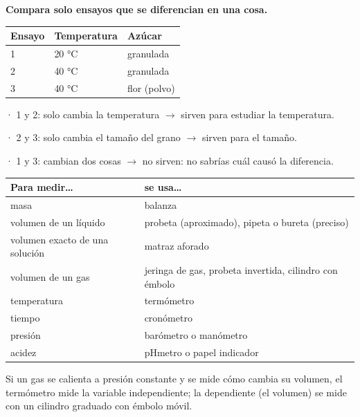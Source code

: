  

\textbf{Compara solo ensayos que se diferencian en una cosa.}

 
\begin{center}\small
\begin{tabular}{@{}lll@{}}
\toprule
\textbf{Ensayo} & \textbf{Temperatura} & \textbf{Azúcar} \\
\midrule
1 & 20 °C & granulada \\
2 & 40 °C & granulada \\
3 & 40 °C & flor (polvo) \\
\bottomrule
\end{tabular}
\end{center}
 

· 1 y 2: solo cambia la temperatura \ensuremath{\rightarrow} sirven para estudiar la temperatura.\par · 2 y 3: solo cambia el tamaño del grano \ensuremath{\rightarrow} sirven para el tamaño.\par · 1 y 3: cambian dos cosas \ensuremath{\rightarrow} no sirven: no sabrías cuál causó la diferencia.

  
\begin{clave} \begin{center}\small
\begin{tabularx}{\linewidth}{@{}>{\raggedright\arraybackslash\hsize=0.86\hsize}X>{\raggedright\arraybackslash\hsize=1.14\hsize}X@{}}
\toprule
\textbf{Para medir\dots{}} & \textbf{se usa\dots{}} \\
\midrule
masa & balanza \\
volumen de un líquido & probeta (aproximado), pipeta o bureta (preciso) \\
volumen exacto de una solución & matraz aforado \\
volumen de un gas & jeringa de gas, probeta invertida, cilindro con émbolo \\
temperatura & termómetro \\
tiempo & cronómetro \\
presión & barómetro o manómetro \\
acidez & pHmetro o papel indicador \\
\bottomrule
\end{tabularx}
\end{center}\end{clave}
 
\begin{ojo} Si un gas se calienta a presión constante y se mide cómo cambia su volumen, el termómetro mide la variable independiente; la dependiente (el volumen) se mide con un cilindro graduado con émbolo móvil.\end{ojo}
